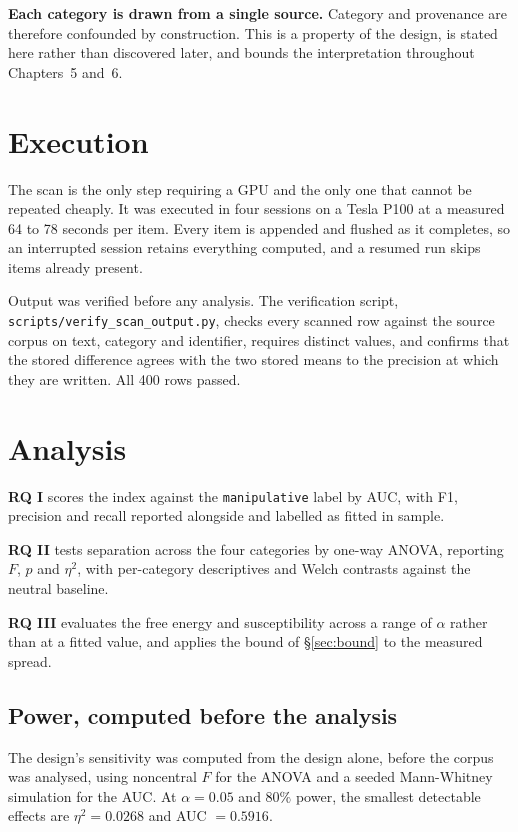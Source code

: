 \textbf{Each category is drawn from a single source.} Category and provenance are therefore
confounded by construction. This is a property of the design, is stated here rather than
discovered later, and bounds the interpretation throughout Chapters~5 and~6.

\section{Execution}

The scan is the only step requiring a GPU and the only one that cannot be repeated cheaply.
It was executed in four sessions on a Tesla P100 at a measured 64 to 78 seconds per item.
Every item is appended and flushed as it completes, so an interrupted session retains
everything computed, and a resumed run skips items already present.

Output was verified before any analysis. The verification script,
\texttt{scripts/verify\_scan\_output.py}, checks every scanned row against the source corpus on text, category and identifier, requires
distinct values, and confirms that the stored difference agrees with the two stored means to
the precision at which they are written. All 400 rows passed.

\section{Analysis}

\textbf{RQ I} scores the index against the \texttt{manipulative} label by AUC, with F1,
precision and recall reported alongside and labelled as fitted in sample.

\textbf{RQ II} tests separation across the four categories by one-way ANOVA, reporting $F$,
$p$ and $\eta^2$, with per-category descriptives and Welch contrasts against the neutral
baseline.

\textbf{RQ III} evaluates the free energy and susceptibility across a range of $\alpha$ rather
than at a fitted value, and applies the bound of \S\ref{sec:bound} to the measured spread.

\subsection{Power, computed before the analysis}

The design's sensitivity was computed from the design alone, before the corpus was analysed,
using noncentral $F$ for the ANOVA and a seeded Mann-Whitney simulation for the AUC. At
$\alpha = 0.05$ and $80\%$ power, the smallest detectable effects are $\eta^2 = 0.0268$ and
AUC $= 0.5916$.

